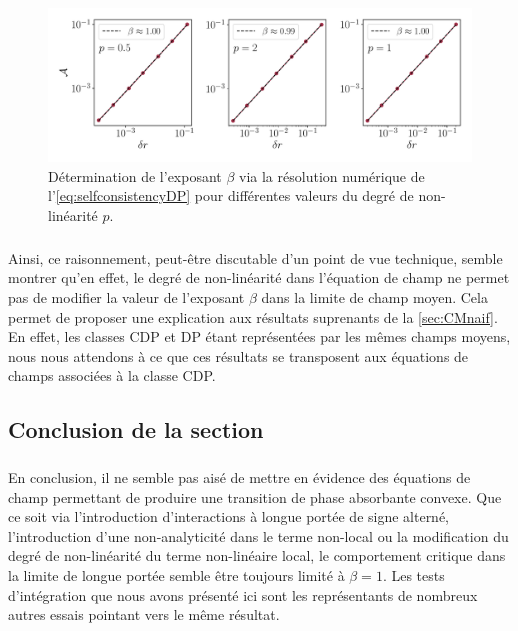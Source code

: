 \begin{figure}[h]
	\centering
	\includegraphics[width=\textwidth]{Chapitre6/Figures/MathematicaMunozDP.pdf}
	\caption{Détermination de l'exposant $\beta$ via la résolution numérique de l'\autoref{eq:selfconsistencyDP} pour différentes valeurs du degré de non-linéarité $p$.}
	\label{fig:MathematicaMunoz}
\end{figure}

\subparagraph{}Ainsi, ce raisonnement, peut-être discutable d'un point de vue technique, semble montrer qu'en effet, le degré de non-linéarité dans l'équation de champ ne permet pas de modifier la valeur de l'exposant $\beta$ dans la limite de champ moyen. Cela permet de proposer une explication aux résultats suprenants de la \autoref{sec:CMnaif}. En effet, les classes CDP et DP étant représentées par les mêmes champs moyens, nous nous attendons à ce que ces résultats se transposent aux équations de champs associées à la classe CDP.

\subsection{Conclusion de la section}

\subparagraph{}En conclusion, il ne semble pas aisé de mettre en évidence des équations de champ permettant de produire une transition de phase absorbante convexe. Que ce soit via l'introduction d'interactions à longue portée de signe alterné, l'introduction d'une non-analyticité dans le terme non-local ou la modification du degré de non-linéarité du terme non-linéaire local, le comportement critique dans la limite de longue portée semble être toujours limité à $\beta = 1$. Les tests d'intégration que nous avons présenté ici sont les représentants de nombreux autres essais pointant vers le même résultat. 

